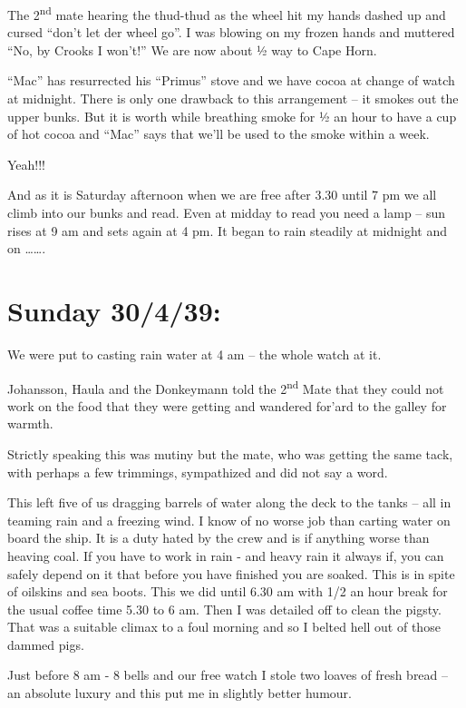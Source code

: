 \documentclass[
  11pt,
  msmallroyalvopaper
]{memoir}
\begin{document}
The 2\textsuperscript{nd} mate hearing the thud-thud as the wheel hit my
hands dashed up and cursed ``don't let der wheel go''. I was blowing on
my frozen hands and muttered ``No, by Crooks I won't!'' We are now about
½ way to Cape Horn.

``Mac'' has resurrected his ``Primus'' stove and we have cocoa at change
of watch at midnight. There is only one drawback to this arrangement --
it smokes out the upper bunks. But it is worth while breathing smoke for
½ an hour to have a cup of hot cocoa and ``Mac'' says that we'll be used
to the smoke within a week.

Yeah!!!

And as it is Saturday afternoon when we are free after 3.30 until 7 pm
we all climb into our bunks and read. Even at midday to read you need a
lamp -- sun rises at 9 am and sets again at 4 pm. It began to rain
steadily at midnight and on \ldots\ldots.

\hypertarget{sunday-30439}{%
\section{Sunday 30/4/39:}\label{sunday-30439}}

We were put to casting rain water at 4 am -- the whole watch at it.

Johansson, Haula and the Donkeymann told the 2\textsuperscript{nd} Mate
that they could not work on the food that they were getting and wandered
for'ard to the galley for warmth.

Strictly speaking this was mutiny but the mate, who was getting the same
tack, with perhaps a few trimmings, sympathized and did not say a word.

This left five of us dragging barrels of water along the deck to the
tanks -- all in teaming rain and a freezing wind. I know of no worse job
than carting water on board the ship. It is a duty hated by the crew and
is if anything worse than heaving coal. If you have to work in rain -
and heavy rain it always if, you can safely depend on it that before you
have finished you are soaked. This is in spite of oilskins and sea
boots. This we did until 6.30 am with 1/2 an hour break for the usual
coffee time 5.30 to 6 am. Then I was detailed off to clean the pigsty.
That was a suitable climax to a foul morning and so I belted hell out of
those dammed pigs.

Just before 8 am - 8 bells and our free watch I stole two loaves of
fresh bread -- an absolute luxury and this put me in slightly better
humour.
\end{document}

